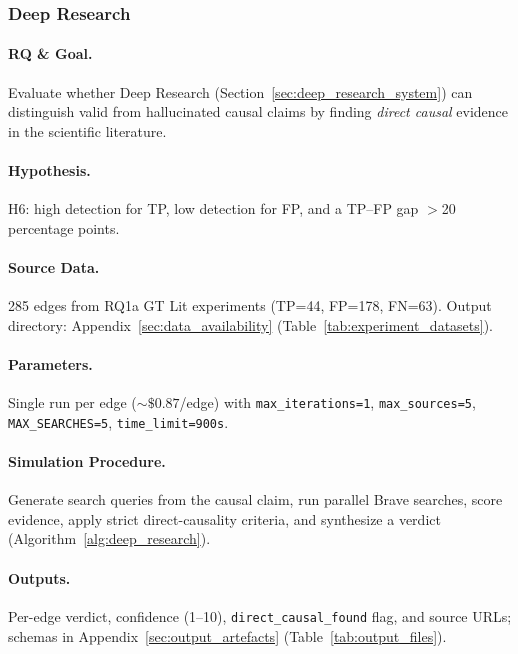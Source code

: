 
\subsubsection{Deep Research}
\label{sec:rq3_deep_research}

\paragraph{RQ \& Goal.}
Evaluate whether Deep Research (Section~\ref{sec:deep_research_system}) can distinguish valid from hallucinated causal claims by finding \emph{direct causal} evidence in the scientific literature.

\paragraph{Hypothesis.}
H6: high detection for TP, low detection for FP, and a TP--FP gap $>$20 percentage points.

\paragraph{Source Data.}
285 edges from RQ1a GT Lit experiments (TP=44, FP=178, FN=63). Output directory: Appendix~\ref{sec:data_availability} (Table~\ref{tab:experiment_datasets}).

\paragraph{Parameters.}
Single run per edge ($\sim\$0.87$/edge) with \texttt{max\_iterations=1}, \texttt{max\_sources=5}, \texttt{MAX\_SEARCHES=5}, \texttt{time\_limit=900s}.

\paragraph{Simulation Procedure.}
Generate search queries from the causal claim, run parallel Brave searches, score evidence, apply strict direct-causality criteria, and synthesize a verdict (Algorithm~\ref{alg:deep_research}).

\paragraph{Outputs.}
Per-edge verdict, confidence (1--10), \texttt{direct\_causal\_found} flag, and source URLs; schemas in Appendix~\ref{sec:output_artefacts} (Table~\ref{tab:output_files}).

